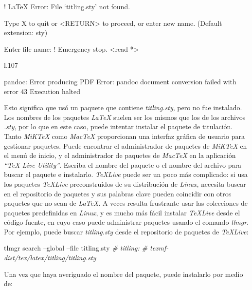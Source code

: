 \documentclass[12pt,]{krantz}
\makeatletter
\newenvironment{Shaded}{\begin{snugshade}}{\end{snugshade}}
\newcommand{\CommentTok}[1]{\textcolor[rgb]{0.56,0.35,0.01}{\textit{#1}}}
\newcommand{\ExtensionTok}[1]{#1}
\newcommand{\NormalTok}[1]{#1}
\newenvironment{kframe}{%
\medskip{}
\setlength{\fboxsep}{.8em}
 \def\at@end@of@kframe{}%
 \ifinner\ifhmode%
  \def\at@end@of@kframe{\end{minipage}}%
  \begin{minipage}{\columnwidth}%
 \fi\fi%
 \def\FrameCommand##1{\hskip\@totalleftmargin \hskip-\fboxsep
 \colorbox{shadecolor}{##1}\hskip-\fboxsep
     \hskip-\linewidth \hskip-\@totalleftmargin \hskip\columnwidth}%
 \MakeFramed {\advance\hsize-\width
   \@totalleftmargin\z@ \linewidth\hsize
   \@setminipage}}%
 {\par\unskip\endMakeFramed%
 \at@end@of@kframe}
\renewenvironment{Shaded}{\begin{kframe}}{\end{kframe}}
\makeatother
\begin{document}
\begin{Shaded}
\begin{Highlighting}[]
\NormalTok{! LaTeX Error: File `titling.sty' not found.}

\NormalTok{Type X to quit or <RETURN> to proceed,}
\NormalTok{or enter new name. (Default extension: sty)}

\NormalTok{Enter file name: }
\NormalTok{! Emergency stop.}
\NormalTok{<read *> }
         
\NormalTok{l.107 ^^M}

\NormalTok{pandoc: Error producing PDF}
\NormalTok{Error: pandoc document conversion failed with error 43}
\NormalTok{Execution halted}
\end{Highlighting}
\end{Shaded}

Esto significa que usó un paquete que contiene \emph{titling.sty}, pero no fue instalado. Los nombres de los paquetes \emph{LaTeX} suelen ser los mismos que los de los archivos \emph{.sty}, por lo que en este caso, puede intentar instalar el paquete de titulación. Tanto \emph{MiKTeX} como \emph{MacTeX} proporcionan una interfaz gráfica de usuario para gestionar paquetes. Puede encontrar el administrador de paquetes de \emph{MiKTeX} en el menú de inicio, y el administrador de paquetes de \emph{MacTeX} en la aplicación \emph{``TeX Live Utility''}. Escriba el nombre del paquete o el nombre del archivo para buscar el paquete e instalarlo. \emph{TeXLive} puede ser un poco más complicado: si usa los paquetes \emph{TeXLive} preconstruidos de su distribución de \emph{Linux}, necesita buscar en el repositorio de paquetes y sus palabras clave pueden coincidir con otros paquetes que no sean de \emph{LaTeX}. A veces resulta frustrante usar las colecciones de paquetes predefinidas en \emph{Linux}, y es mucho más fácil instalar \emph{TeXLive} desde el código fuente, en cuyo caso puede administrar paquetes usando el comando \emph{tlmgr}. Por ejemplo, puede buscar \emph{titling.sty} desde el repositorio de paquetes de \emph{TeXLive}:

\begin{Shaded}
\begin{Highlighting}[]
\ExtensionTok{tlmgr}\NormalTok{ search --global --file titling.sty}
\CommentTok{# titling:}
\CommentTok{#    texmf-dist/tex/latex/titling/titling.sty}
\end{Highlighting}
\end{Shaded}

Una vez que haya averiguado el nombre del paquete, puede instalarlo por medio de:
\end{document}
